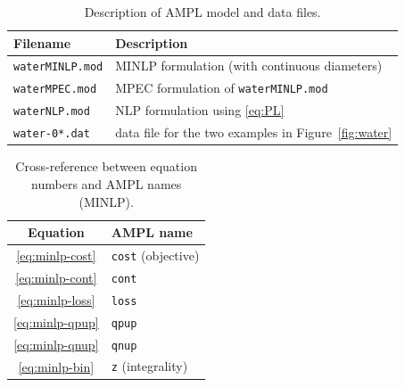 \documentclass[11pt]{article}
\newcommand{\ampl}[1]{\texttt{#1}}
\begin{document}
\begin{table}[htbp]
  \centering
  \caption{Description of AMPL model and data files.}
  \label{tab:ref-ampl}
  \begin{tabular}{l l}
    \toprule
    Filename & Description \\
    \midrule
    \ampl{waterMINLP.mod} & MINLP formulation (with continuous diameters) \\
    \ampl{waterMPEC.mod} & MPEC formulation of \ampl{waterMINLP.mod} \\
    \ampl{waterNLP.mod} & NLP formulation using \eqref{eq:PL} \\
    \ampl{water-0*.dat} & data file for the two examples in Figure~\ref{fig:water}\\
    \bottomrule
  \end{tabular}
\end{table}

\begin{table}[htbp]
  \centering
  \caption{Cross-reference between equation numbers and AMPL names (MINLP).}
  \label{tab:ref-minlp}
  \begin{tabular}{c l}
    \toprule
    Equation & AMPL name \\
    \midrule
    \eqref{eq:minlp-cost} & \ampl{cost} (objective) \\
    \eqref{eq:minlp-cont} & \ampl{cont} \\
    \eqref{eq:minlp-loss} & \ampl{loss} \\
    \eqref{eq:minlp-qpup} & \ampl{qpup} \\
    \eqref{eq:minlp-qnup} & \ampl{qnup} \\
    \eqref{eq:minlp-bin}  & \ampl{z} (integrality) \\
    \bottomrule
  \end{tabular}
\end{table}
\end{document}
